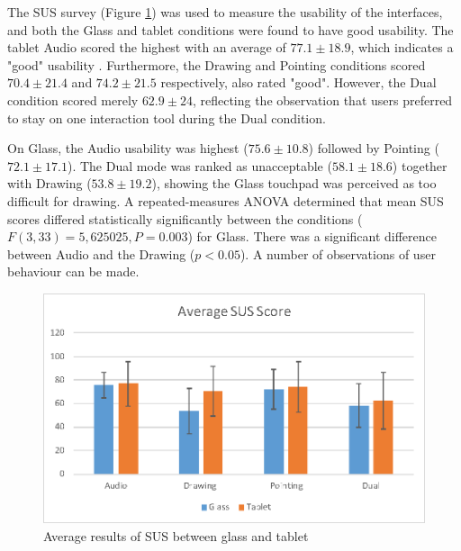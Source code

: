 
The SUS survey (Figure \ref{fig:ismar14:sus}) was used to measure the usability of the interfaces, and both the Glass and tablet conditions were found to have good usability. The tablet Audio scored the highest with an average of $77.1\pm18.9$, which indicates a "good" usability \cite{Bangor2008}. Furthermore, the Drawing and Pointing conditions scored $70.4\pm21.4$ and $74.2\pm21.5$ respectively, also rated "good". However, the Dual condition scored merely $62.9\pm24$, reflecting the observation that users preferred to stay on one interaction tool during the Dual condition.

On Glass, the Audio usability was highest ($75.6\pm10.8$) followed by Pointing ($72.1\pm17.1$). The Dual mode was ranked as unacceptable ($58.1\pm18.6$) together with Drawing ($53.8\pm19.2$), showing the Glass touchpad was perceived as too difficult for drawing. A repeated-measures ANOVA determined that mean SUS scores differed statistically significantly between the conditions ($F(3, 33)=5,625025, P=0.003$) for Glass. There was a significant difference between Audio and the Drawing ($p<0.05$). A number of observations of user behaviour can be made. 

\begin{figure}
    \centering
    \includegraphics[width=.8\linewidth]{images/63-pano-ismar14/images-01.eps}
    \caption{Average results of SUS between glass and tablet}
    \label{fig:ismar14:sus}
\end{figure}

